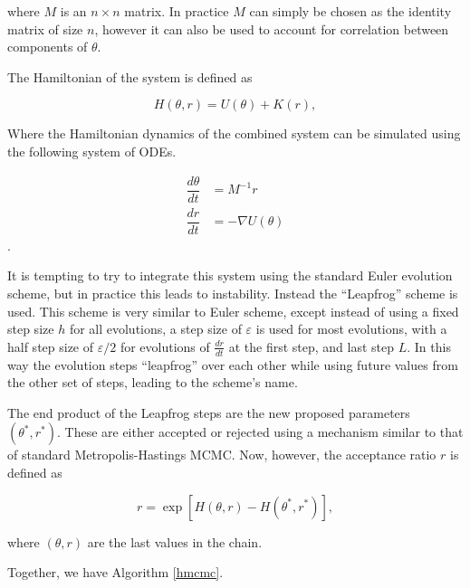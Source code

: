     where $M$ is an $n \times n$ matrix. In practice $M$ can simply be chosen as the identity matrix of size $n$, however it can also be used to account for correlation between components of $\theta$.

    The Hamiltonian of the system is defined as

    \begin{equation}
        H(\theta,r) = U(\theta) + K(r),
    \end{equation}

    Where the Hamiltonian dynamics of the combined system can be simulated using the following system of ODEs.

    \begin{equation}
        \begin{array}{rl}
        \displaystyle
            \dfrac{d\theta}{dt} & = M^{-1} r \\
            \dfrac{dr}{dt} & = - \nabla U(\theta)
        \end{array}
    \end{equation}.

    It is tempting to try to integrate this system using the standard Euler evolution scheme, but in practice this leads to instability. Instead the ``Leapfrog'' scheme is used. This scheme is very similar to Euler scheme, except instead of using a fixed step size $h$ for all evolutions, a step size of $\varepsilon$ is used for most evolutions, with a half step size of $\varepsilon / 2$ for evolutions of $\frac{dr}{dt}$ at the first step, and last step $L$. In this way the evolution steps ``leapfrog'' over each other while using future values from the other set of steps, leading to the scheme's name.

    The end product of the Leapfrog steps are the new proposed parameters $(\theta^*,r^*)$. These are either accepted or rejected using a mechanism similar to that of standard Metropolis-Hastings MCMC. Now, however, the acceptance ratio $r$ is defined as

    \begin{equation}
        r = \exp \left[ H(\theta,r) - H(\theta^*,r^*) \right],
    \end{equation}

    where $(\theta,r)$ are the last values in the chain.

    Together, we have Algorithm \ref{hmcmc}.


